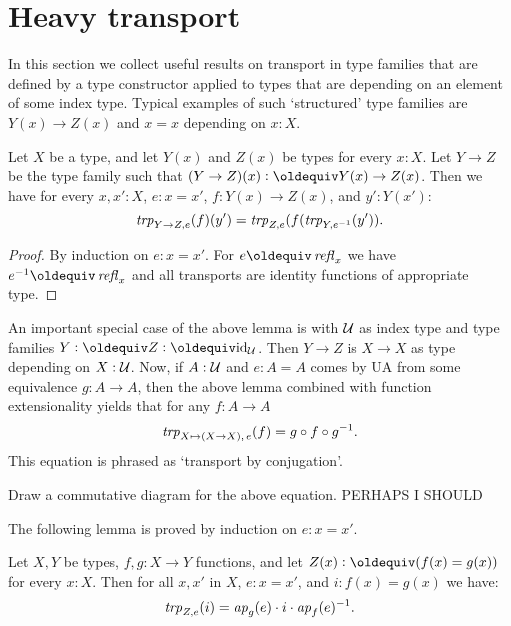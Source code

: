 \section{Heavy transport}
\label{sec:heavy-transport}

In this section we collect useful results on transport in
type families that are defined by a type constructor applied
to types that are depending on an element of some index type.
Typical examples of such `structured' type families are 
$Y(x)\to Z(x)$ and $x=x$ depending on $x:X$.

\begin{lemma}\label{lem:trp-in-function-type}
Let $X$ be a type, and let $Y(x)$ and $Z(x)$ be types for every $x:X$.
Let $Y\to Z$ be the type family such that $(Y\to Z)(x) \defeq Y(x)\to Z(x)$.
Then we have for every $x,x':X$, $e: x=x'$, $f: Y(x)\to Z(x)$, and $y':Y(x')$:
\[
\mathord{\mathit{trp}}_{Y\to Z, e} (f)(y') = \mathord{\mathit{trp}}_{Z,e} (f(\mathord{\mathit{trp}}_{Y, e^{-1}}(y')).
\]
\end{lemma}
\begin{proof}
By induction on $e: x=x'$. For $e \jdeq \refl{x}$ we have $e^{-1}\jdeq \refl{x}$
and all transports are identity functions of appropriate type. 
\end{proof}

An important special case of the above lemma is with $\mathcal{U}$
as index type and type families $Y\defeq Z\defeq \id_\UU$.
Then $Y\to Z$ is $X\to X$ as type depending on $X:\mathcal{U}$. Now, 
if $A:\mathcal{U}$ and $e: A=A$ comes by UA from some equivalence 
$g:A\to A$, then the above lemma combined with function extensionality 
yields that for any $f: A\to A$
\[
\mathord{\mathit{trp}}_{X\mapsto(X\to X),\,e} (f) = g\circ f \circ g^{-1}.
\]
This equation is phrased as `transport by conjugation'.

\begin{xca}\label{xca:conjugation}
Draw a commutative diagram for the above equation. PERHAPS I SHOULD
\end{xca}

The following lemma is proved by induction on $e: x=x'$.

\begin{lemma}\label{lem:trp-in-fx=Ygx}
Let $X,Y$ be types, $f,g: X\to Y$ functions, and let
$Z(x)\defeq (f(x)=g(x))$ for every $x:X$. 
Then for all $x,x'$ in $X$, $e: x=x'$, and $i: f(x)=g(x)$ we have:
\[
\mathord{\mathit{trp}}_{Z, e} (i) = \mathop{{\it ap}_{g}}(e) \cdot i \cdot \mathop{{\it ap}_{f}}(e)^{-1}.
\]
\end{lemma}

